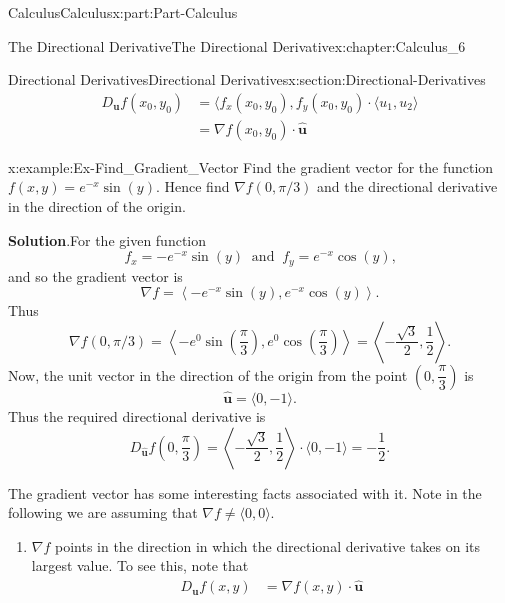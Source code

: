 \documentclass[oneside,10pt,]{book}
\newcommand{\blocktitlefont}{\relax}
\numberwithin{equation}{section}
\newcommand{\bm}[1]{\boldsymbol{#1}}
\newcommand{\amp}{&}
\begin{document}
\begin{partptx}{Calculus}{}{Calculus}{}{}{x:part:Part-Calculus}
\begin{chapterptx}{The Directional Derivative}{}{The Directional Derivative}{}{}{x:chapter:Calculus_6}
\begin{sectionptx}{Directional Derivatives}{}{Directional Derivatives}{}{}{x:section:Directional-Derivatives}
\begin{align*}
D_{\bm{u}} f(x_0,y_0) \amp = \langle f_x(x_0,y_0),f_y(x_0,y_0) \cdot \langle u_1, u_2 \rangle\\
\amp = \nabla f(x_0,y_0) \cdot \hat{\bm{u}}
\end{align*}
%
\begin{example}{}{x:example:Ex-Find_Gradient_Vector}%
Find the gradient vector for the function \(f(x,y) = e^{-x} \sin(y)\). Hence find \(\nabla f(0,\pi/3)\) and the directional derivative in the direction of the origin.%
\par\smallskip%
\noindent\textbf{\blocktitlefont Solution}.\hypertarget{g:solution:id550014}{}\quad{}For the given function%
\begin{equation*}
f_x = -e^{-x} \sin(y) \: \text{ and } \: f_y = e^{-x}\cos(y)\text{,}
\end{equation*}
and so the gradient vector is%
\begin{equation*}
\nabla f = \left \langle -e^{-x}\sin(y), e^{-x}\cos(y) \right \rangle\text{.}
\end{equation*}
Thus%
\begin{equation*}
\nabla f(0, \pi/3) = \left \langle -e^0 \sin \left( \dfrac{\pi}{3} \right), e^0 \cos \left( \dfrac{\pi}{3} \right) \right \rangle = \left \langle - \dfrac{\sqrt{3}}{2} , \dfrac{1}{2} \right \rangle\text{.}
\end{equation*}
Now, the unit vector in the direction of the origin from the point \(\left( 0, \dfrac{\pi}{3} \right)\) is%
\begin{equation*}
\hat{\bm{u}} = \langle 0, -1 \rangle\text{.}
\end{equation*}
Thus the required directional derivative is%
\begin{equation*}
D_{\hat{\bm{u}}} f \left( 0, \dfrac{\pi}{3} \right) = \left \langle -\dfrac{\sqrt{3}}{2} , \dfrac{1}{2} \right \rangle \cdot \langle 0, -1 \rangle = - \dfrac{1}{2}\text{.}
\end{equation*}
%
\end{example}
The gradient vector has some interesting facts associated with it. Note in the following we are assuming that \(\nabla f \neq \langle 0, 0 \rangle\).%
\par
%
\begin{enumerate}[label=\arabic*]
\item{}\(\nabla f\) points in the direction in which the directional derivative takes on its largest value. To see this, note that%
\begin{align*}
D_{\bm{u}} f(x,y) \amp = \nabla f(x,y) \cdot \hat{\bm{u}}\\

\end{align*}
\end{enumerate}
\end{sectionptx}
\end{chapterptx}
\end{partptx}
\end{document}
